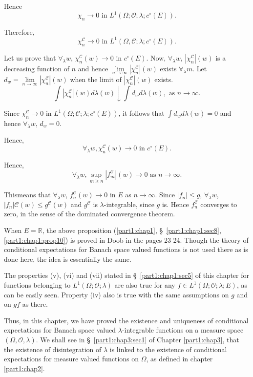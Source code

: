 Hence
$$
\chi_n \to 0 \text{ in } L^1 (\Omega; \mathscr{O}; \lambda; c^\circ
(E)). 
$$

Therefore, 
$$
\chi^\mathscr{C}_n \to 0 \text{ in } L^1 (\Omega, \mathscr{C};
\lambda; c^\circ (E)). 
$$

Let us prove that $\forall_\lambda w$, $\chi^\mathscr{C}_n (w) \to 0$
in $c^\circ (E)$. Now, $\forall_\lambda w$, $|\chi^\mathscr{C}_n|(w)$
is a decreasing function of $n$ and hence $\lim\limits_{n \to \infty}
|\chi^\mathscr{C}_n| (w)$  exists $\forall_\lambda m$. Let $d_w =
\lim\limits_{n \to \infty} |\chi^\mathscr{C}_n|(w)$ when the limit of
$|\chi^\mathscr{C}_n|(w)$ exists. 
$$
\int |\chi^\mathscr{C}_n| (w) d \lambda (w) \downarrow \int d_w d
\lambda (w), \text{ as } n \to \infty. 
$$

Since $\chi^\mathscr{C}_n \to 0$ in $L^1 (\Omega; \mathscr{C};
\lambda; c^\circ (E))$, it follows that $\int d_w d\lambda(w) = 0$ and
hence $\forall_\lambda w$, $d_w =0$. 

Hence, 
$$
\forall_\lambda w, \chi^\mathscr{C}_n(w) \to 0 \text{ in }
c^\circ(E). 
$$

Hence, 
$$
\forall_\lambda w, \sup\limits_{m \geq n} |f^\mathscr{C}_m| (w) \to 0
\text{ as } n \to \infty. 
$$

This\pageoriginale means that $\forall_\lambda w$, $f^\mathscr{C}_n(w)
\to 0$ in $E$ as $n \to \infty$. Since  $|f_n| \leq g$,
$\forall_\lambda w$, $|f_n|\mathscr{C} (w) \leq g^\mathscr{C}(w)$ and
$g^\mathscr{C}$ is $\lambda$-integrable, since $g$ is. Hence
$f^\mathscr{C}_n$ converges to zero, in the sense of the dominated
convergence theorem. 


\begin{rem}\label{part1:chap1:rem11}
When $E = \mathbb{R}$, the above proposition (\ref{part1:chap1},
\S\ \ref{part1:chap1:sec8}, \ref{part1:chap1:prop10}) is proved
in Doob \cite{key1} in the pages 23-24. Though the theory of
conditional expectations for Banach space valued functions is not used
there as is done here, the idea is essentially the same. 
\end{rem}

The properties (v), (vi) and (vii) stated in
\S\ \ref{part1:chap1:sec5} of this chapter for 
functions belonging to $L^1(\Omega; \mathscr{O}; \lambda)$ are also
true for any $f \in L^1 (\Omega; \mathscr{O}; \lambda; E)$, as can be
easily seen. Property (iv) also is true with the same assumptions on
$g$ and on $gf$ as there.

Thus, in this chapter, we have proved the existence and uniqueness of
conditional expectations for Banach space valued $\lambda$-integrable
functions on a measure space $(\Omega, \mathscr{O}, \lambda)$. We
shall see in \S\ \ref{part1:chap3:sec1} of Chapter
\ref{part1:chap3}, that the existence of 
disintegration of $\lambda$ is linked to the existence of conditional
expectations for measure valued functions on $\Omega$, as defined in
chapter \ref{part1:chap2}. 

